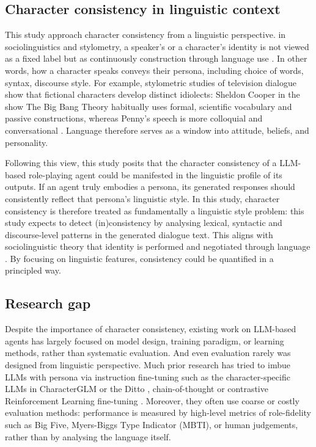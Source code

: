 \documentclass{article}
\begin{document}
\subsection{Character consistency in linguistic context}
This study approach character consistency from a linguistic perspective. in sociolinguistics and stylometry, a speaker's or a character's identity is not viewed as a fixed label but as continuously construction through language use \citep{ przystalski2025stylometry}. In other words, how a character speaks conveys their persona, including choice of words, syntax, discourse style. For example, stylometric studies of television dialogue show that fictional characters develop distinct idiolects: Sheldon Cooper in the show The Big Bang Theory habitually uses formal, scientific vocabulary and passive constructions, whereas Penny's speech is more colloquial and conversational \citep{van2016stylometry}. Language therefore serves as a window into attitude, beliefs, and personality.

Following this view, this study posits that the character consistency of a LLM-based role-playing agent could be manifested in the linguistic profile of its outputs. If an agent truly embodies a persona, its generated responses should consistently reflect that persona's linguistic style. In this study, character consistency is therefore treated as fundamentally a linguistic style problem: this study expects to detect (in)consistency by analysing lexical, syntactic and discourse-level patterns in the generated dialogue text. This aligns with sociolinguistic theory that identity is performed and negotiated through language \citep{bucholtz2005identity}. By focusing on linguistic features, consistency could be quantified in a principled way.

\subsection{Research gap}

Despite the importance of character consistency, existing work on LLM-based agents has largely focused on model design, training paradigm, or learning methods, rather than systematic evaluation. And even evaluation rarely was designed from linguistic perspective. Much prior research has tried to imbue LLMs with persona via instruction fine-tuning such as the character-specific LLMs in CharacterGLM \citep{zhou2023characterglm} or the Ditto \citep{li2021ditto, lu2024large}, chain-of-thought \citep{chae2023dialogue}  or contrastive Reinforcement Learning fine-tuning \citep{shea2023building}. Moreover, they often use coarse or costly evaluation methods: performance is measured by high-level metrics of role-fidelity such as Big Five, Myers-Biggs Type Indicator (MBTI), or human judgements, rather than by analysing the language itself.
\end{document}
